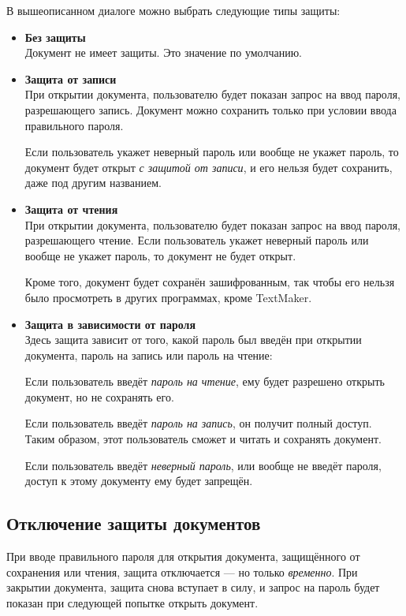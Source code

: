 ﻿\documentclass[a4paper,10pt]{article}
\begin{document}
В вышеописанном диалоге можно выбрать следующие типы защиты:
\begin{itemize}
 \item \textbf{Без защиты}\\
 Документ не имеет защиты. Это значение по умолчанию.
 \item \textbf{Защита от записи}\\
 При открытии документа, пользователю будет показан запрос на ввод пароля, разрешающего запись. Документ можно сохранить только при условии ввода правильного пароля.
 
 Если пользователь укажет неверный пароль или вообще не укажет пароль, то документ будет открыт \textit{с защитой от записи}, и его нельзя будет сохранить, даже под другим названием. 
 \item \textbf{Защита от чтения}\\
 При открытии документа, пользователю будет показан запрос на ввод пароля, разрешающего чтение. Если пользователь укажет неверный пароль или вообще не укажет пароль, то документ не будет открыт.
 
 Кроме того, документ будет сохранён зашифрованным, так чтобы его нельзя было просмотреть в других программах, кроме TextMaker.
 \item \textbf{Защита в зависимости от пароля}\\
 Здесь защита зависит от того, какой пароль был введён при открытии документа, пароль на запись или пароль на чтение:
 
 Если пользователь введёт \textit{пароль на чтение}, ему будет разрешено открыть документ, но не сохранять его.
 
 Если пользователь введёт \textit{пароль на запись}, он получит полный доступ. Таким образом, этот пользователь сможет и читать и сохранять документ.
 
 Если пользователь введёт \textit{неверный пароль}, или вообще не введёт пароля, доступ к этому документу ему будет запрещён.
\end{itemize}

\subsection{Отключение защиты документов}
При вводе правильного пароля для открытия документа, защищённого от сохранения или чтения, защита отключается — но только \textit{временно}. При закрытии документа, защита снова вступает в силу, и запрос на пароль будет показан при следующей попытке открыть документ.
\end{document}
